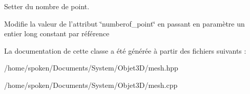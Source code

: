 Setter du nombre de point. 

Modifie la valeur de l'attribut \char`\"{}numberof\-\_\-point\char`\"{} en passant en paramètre un entier long constant par référence 

La documentation de cette classe a été générée à partir des fichiers suivants \-:\begin{DoxyCompactItemize}
\item 
/home/spoken/\-Documents/\-System/\-Objet3\-D/mesh.\-hpp\item 
/home/spoken/\-Documents/\-System/\-Objet3\-D/mesh.\-cpp\end{DoxyCompactItemize}
